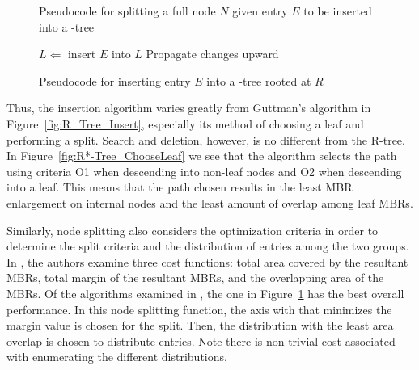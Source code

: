 \begin{figure}[b!]
\begin{algorithmic}
		\EndFor
	\EndFunction
\end{algorithmic}
\caption{Pseudocode for splitting a full node $N$ given entry $E$ to be inserted into 
	a \rstar-tree}
\label{fig:R*-Tree_Split}
\end{figure}

\begin{figure}[ht!]
\begin{algorithmic}
		\State $L\Leftarrow$ 
			\State insert $E$ into $L$
		\Else
				\State {}
			\Else
				\State {}
			\EndIf
		\EndIf
		\State Propagate changes upward
	\EndFunction
\end{algorithmic}
\caption{Pseudocode for inserting entry $E$ into a \rstar-tree rooted at $R$}
\label{fig:R*-Tree_Insert}
\end{figure}

Thus, the insertion algorithm varies greatly from Guttman's algorithm in 
Figure~\ref{fig:R_Tree_Insert}, especially its method of choosing a leaf and performing a 
split. Search and deletion, however, is no different from the R-tree. In 
Figure~\ref{fig:R*-Tree_ChooseLeaf} we see that the algorithm selects the path using criteria
O1 when descending into non-leaf nodes and O2 when descending into a leaf. This means that
the path chosen results in the least MBR enlargement on internal nodes and the least 
amount of overlap among leaf MBRs. 

Similarly, node splitting also considers the optimization criteria in order to determine
the split criteria and the distribution of entries among the two groups. In 
\cite{beckmannkriegelschneiderseeger90}, the authors examine three cost functions: total area 
covered by the resultant MBRs, total margin of the resultant MBRs, and the overlapping area 
of the MBRs. Of the algorithms examined in \cite{beckmannkriegelschneiderseeger90}, the one in 
Figure~\ref{fig:R*-Tree_Split} has the best overall performance. In this node splitting 
function, the axis with that minimizes the margin value is chosen for the split. Then, the 
distribution with the least area overlap is chosen to distribute entries. Note there is 
non-trivial cost associated with enumerating the different distributions.

